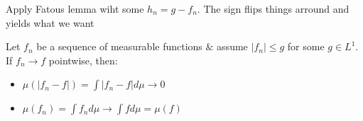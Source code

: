 \par\bigskip
\begin{prf}[]{}
  Apply Fatous lemma wiht some $h_n = g-f_n$. The sign flips things arround and yields what we want
\end{prf}
\par\bigskip
\begin{theo}{}
  Let $f_n$ be a sequence of measurable functions $\&$ assume $\left|f_n\right|\leq g$ for some $g\in L^1$. If $f_n\to f$ pointwise, then:\par
  \begin{itemize}
    \item $\mu(\left|f_n-f\right|) = \int \left|f_n-f\right|d\mu\to0$
    \item $\mu(f_n) = \int f_n d\mu\to\int f d\mu = \mu(f)$
  \end{itemize}
\end{theo}
